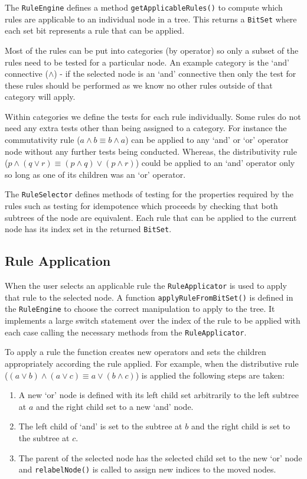 \documentclass{report}
\begin{document}
The {\tt RuleEngine} defines a method {\tt getApplicableRules()} to compute which rules are applicable to an individual node in a tree. This returns a {\tt BitSet} where each set bit represents a rule that can be applied.

Most of the rules can be put into categories (by operator) so only a subset of the rules need to be tested for a particular node. An example category is the `and' connective ($\land$) - if the selected node is an `and' connective then only the test for these rules should be performed as we know no other rules outside of that category will apply.

Within categories we define the tests for each rule individually. Some rules do not need any extra tests other than being assigned to a category. For instance the commutativity rule ($a \land b \equiv b \land a$) can be applied to any `and' or `or' operator node without any further tests being conducted. Whereas, the distributivity rule ($p\land(q\lor r) \equiv (p\land q)\lor(p\land r)$) could be applied to an `and' operator only so long as one of its children was an `or' operator.

The {\tt RuleSelector} defines methods of testing for the properties required by the rules such as testing for idempotence which proceeds by checking that both subtrees of the node are equivalent. Each rule that can be applied to the current node has its index set in the returned {\tt BitSet}.

\subsection{Rule Application}
\label{sub:rule_application}

When the user selects an applicable rule the {\tt RuleApplicator} is used to apply that rule to the selected node. A function {\tt applyRuleFromBitSet()} is defined in the {\tt RuleEngine} to choose the correct manipulation to apply to the tree. It implements a large switch statement over the index of the rule to be applied with each case calling the necessary methods from the {\tt RuleApplicator}.

To apply a rule the function creates new operators and sets the children appropriately according the rule applied. For example, when the distributive rule ($(a \lor b) \land (a \lor c) \equiv a \lor (b \land c)$) is applied the following steps are taken:

\begin{enumerate}
\item A new `or' node is defined with its left child set arbitrarily to the left subtree at $a$ and the right child set to a new `and' node.
\item The left child of `and' is set to the subtree at $b$ and the right child is set to the subtree at $c$.
\item The parent of the selected node has the selected child set to the new `or' node and {\tt relabelNode()} is called to assign new indices to the moved nodes.
\end{enumerate}
\end{document}
